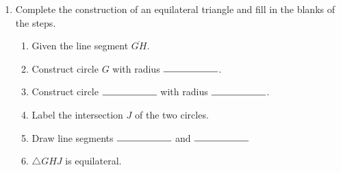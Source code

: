 \documentclass[12pt, oneside]{article}
\begin{document}
\begin{enumerate}
      \item Complete the construction of an equilateral triangle and fill in the blanks of the steps.
      \begin{enumerate}
        \item Given the line segment $\overline{GH}$. \bigskip
        \item Construct circle $G$ with radius $\rule{2cm}{0.15mm}$. \bigskip
        \item Construct circle $\rule{2cm}{0.15mm}$  with radius $\rule{2cm}{0.15mm}$. \bigskip
        \item Label the intersection $J$ of the two circles. \bigskip
        \item Draw line segments $\rule{2cm}{0.15mm}$  and $\rule{2cm}{0.15mm}$
        \item $\triangle GHJ$ is equilateral.
      \end{enumerate}
      \vspace{5cm}
      \begin{center}
      \end{center}

    \end{enumerate}

\newpage
\end{document}
